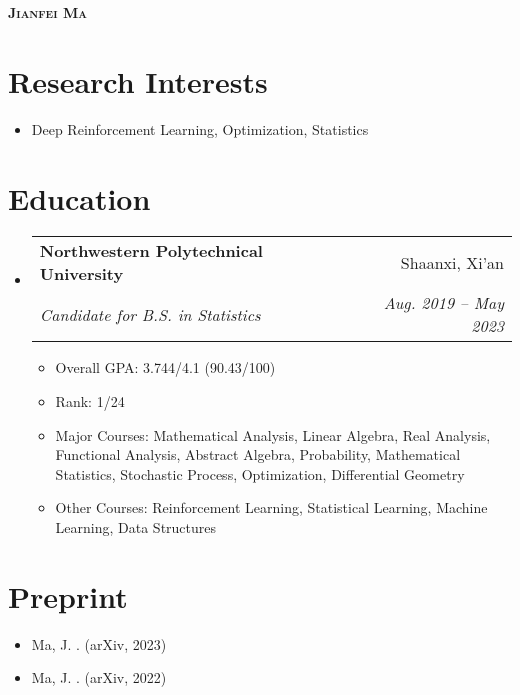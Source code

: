 \documentclass[letterpaper,11pt]{article}
\makeatletter
\newcommand{\resumeItem}[1]{
  \item\small{
    {#1 \vspace{-2pt}}
  }
}
\newcommand{\resumeSubheading}[4]{
  \vspace{-2pt}\item
    \begin{tabular*}{0.97\textwidth}[t]{l@{\extracolsep{\fill}}r}
      \textbf{#1} & #2 \\
      \textit{\small#3} & \textit{\small #4} \\
    \end{tabular*}\vspace{-7pt}
}
\newcommand{\resumeSubHeadingListStart}{\begin{itemize}[leftmargin=0.15in, label={}]}
\newcommand{\resumeSubHeadingListEnd}{\end{itemize}}
\newcommand{\resumeItemListStart}{\begin{itemize}}
\newcommand{\resumeItemListEnd}{\end{itemize}\vspace{-5pt}}
\makeatother
\begin{document}

\begin{center}
    \textbf{\Huge \scshape Jianfei Ma} \\ \vspace{1pt}
    \small{\item{
     {\href{mailto:matrixfeeney@gmail.com}{}}
    {\href{https://github.com/MagiFeeney}{}}     
     {\href{https://magifeeney.github.io}{}}       
    }}
\end{center}

\section{Research Interests}
  \resumeSubHeadingListStart
    \resumeItem
      {Deep Reinforcement Learning, Optimization, Statistics}%
  \resumeSubHeadingListEnd

\section{Education}
  \resumeSubHeadingListStart
    \resumeSubheading
      {Northwestern Polytechnical University}{Shaanxi, Xi'an}
      {Candidate for B.S. in Statistics}{Aug. 2019 -- May 2023}
    \resumeItemListStart
      \resumeItem
      {Overall GPA: 3.744/4.1 (90.43/100)}
     \resumeItem
      {Rank: 1/24}
     \resumeItem
      {Major Courses: Mathematical Analysis, Linear Algebra, Real Analysis, Functional Analysis, Abstract Algebra, Probability, Mathematical Statistics, Stochastic Process, Optimization, Differential Geometry}
      \resumeItem
      {Other Courses: Reinforcement Learning, Statistical Learning, Machine Learning, Data Structures}
    \resumeItemListEnd
  \resumeSubHeadingListEnd

\section{Preprint}
      \resumeItemListStart
        \resumeItem{Ma, J. \href{https://arxiv.org/abs/2302.00533}{\color{darkblue}{Distillation Policy Optimization}}. (arXiv, 2023)}
        \resumeItem{Ma, J. \href{https://arxiv.org/abs/2208.09322v2}{\color{darkblue}{Entropy Augmented Reinforcement Learning}}. (arXiv, 2022)}
      \resumeItemListEnd
      
\end{document}
